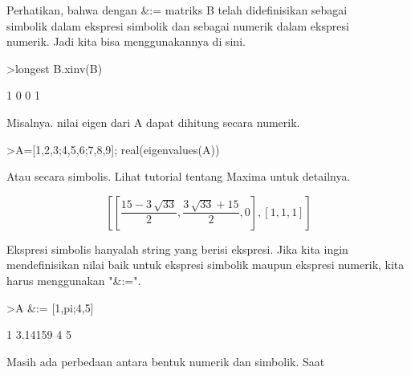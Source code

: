 \documentclass[a4paper,10pt]{article}
\begin{document}
\begin{eulernotebook}
\begin{eulercomment}
\begin{eulercomment}
\begin{eulercomment}
\begin{eulercomment}
\begin{eulercomment}
Perhatikan, bahwa dengan \&:= matriks B telah didefinisikan sebagai\\
simbolik dalam ekspresi simbolik dan sebagai numerik dalam ekspresi\\
numerik. Jadi kita bisa menggunakannya di sini.
\end{eulercomment}
\begin{eulerprompt}
>longest B.xinv(B)
\end{eulerprompt}
\begin{euleroutput}
                        1                       0 
                        0                       1 
\end{euleroutput}
\begin{eulercomment}
Misalnya. nilai eigen dari A dapat dihitung secara numerik.
\end{eulercomment}
\begin{eulerprompt}
>A=[1,2,3;4,5,6;7,8,9]; real(eigenvalues(A))
\end{eulerprompt}
\begin{euleroutput}
  [16.1168,  -1.11684,  0]
\end{euleroutput}
\begin{eulercomment}
Atau secara simbolis. Lihat tutorial tentang Maxima untuk detailnya.
\end{eulercomment}
\begin{eulerformula}
\[
\left[ \left[ \frac{15-3\,\sqrt{33}}{2} , \frac{3\,\sqrt{33}+15}{2}   , 0 \right]  , \left[ 1 , 1 , 1 \right]  \right] 
\]
\end{eulerformula}
\begin{eulercomment}
\end{eulercomment}
\begin{eulercomment}
Ekspresi simbolis hanyalah string yang berisi ekspresi. Jika kita
ingin mendefinisikan nilai baik untuk ekspresi simbolik maupun
ekspresi numerik, kita harus menggunakan "\&:=".
\end{eulercomment}
\begin{eulerprompt}
>A &:= [1,pi;4,5]
\end{eulerprompt}
\begin{euleroutput}
              1       3.14159 
              4             5 
\end{euleroutput}
\begin{eulercomment}
Masih ada perbedaan antara bentuk numerik dan simbolik. Saat\\

\end{eulercomment}
\end{eulercomment}
\end{eulercomment}
\end{eulercomment}
\end{eulercomment}
\end{eulernotebook}
\end{document}
